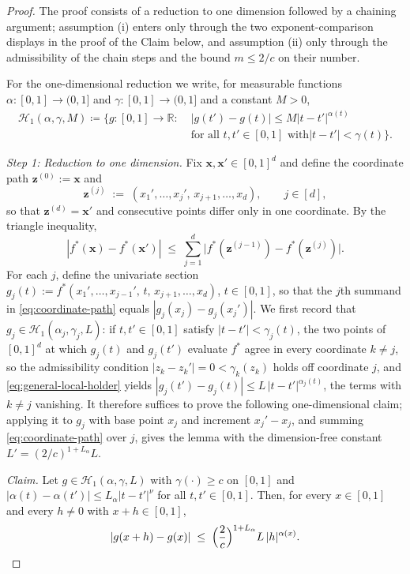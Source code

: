 \documentclass[10pt,a4paper]{amsart}
\newcommand{\bx}{\mathbf{x}}
\newcommand{\bz}{\mathbf{z}}
\begin{document}
\begin{proof}
The proof consists of a reduction to one dimension followed by a
chaining argument; assumption (i) enters only through the two
exponent-comparison displays in the proof of the Claim below, and
assumption (ii) only through the admissibility of the chain steps and
the bound $m\le 2/c$ on their number.

For the one-dimensional reduction we write, for measurable functions
$\alpha:[0,1]\to(0,1]$ and $\gamma:[0,1]\to(0,1]$ and a constant
$M>0$,
\begin{equation}\label{eq:1d-class}
\begin{aligned}
\mathcal{H}_1(\alpha,\gamma,M)
\coloneqq\bigl\{g:[0,1]\to\mathbb{R}:\;&
\lvert g(t')-g(t)\rvert
\le M\lvert t-t'\rvert^{\alpha(t)}\\
&\text{for all $t,t'\in[0,1]$ with
$\lvert t-t'\rvert<\gamma(t)$}\bigr\}.
\end{aligned}
\end{equation}

\medskip
\noindent\textit{Step 1: Reduction to one dimension.} Fix
$\bx,\bx'\in[0,1]^d$ and define the coordinate path
$\bz^{(0)}:=\bx$ and
\[
  \bz^{(j)} \;:=\; (x_1',\ldots,x_j',\,x_{j+1},\ldots,x_d),
  \qquad j\in[d],
\]
so that $\bz^{(d)}=\bx'$ and consecutive points differ only in one
coordinate. By the triangle inequality,
\begin{equation}\label{eq:coordinate-path}
  |f^*(\bx)-f^*(\bx')|
  \;\le\; \sum_{j=1}^d
  \bigl|f^*(\bz^{(j-1)})-f^*(\bz^{(j)})\bigr| .
\end{equation}
For each $j$, define the univariate section
$g_j(t):=f^*(x_1',\ldots,x_{j-1}',\,t,\,x_{j+1},\ldots,x_d)$,
$t\in[0,1]$, so that the $j$th summand in \eqref{eq:coordinate-path}
equals $|g_j(x_j)-g_j(x_j')|$. We first record that
$g_j\in\mathcal{H}_{1}(\alpha_j,\gamma_j,L)$: if
$t,t'\in[0,1]$ satisfy $|t-t'|<\gamma_j(t)$, the two points of
$[0,1]^d$ at which $g_j(t)$ and $g_j(t')$ evaluate $f^*$ agree in
every coordinate $k\neq j$, so the admissibility condition
$|z_k-z_k'|=0<\gamma_k(z_k)$ holds off coordinate $j$, and
\eqref{eq:general-local-holder} yields
$|g_j(t')-g_j(t)|\le L\,|t-t'|^{\alpha_j(t)}$, the terms with
$k\neq j$ vanishing. It therefore suffices to prove the following
one-dimensional claim; applying it to $g_j$ with base point $x_j$ and
increment $x_j'-x_j$, and summing \eqref{eq:coordinate-path} over $j$,
gives the lemma with the dimension-free constant
$L'=(2/c)^{1+L_\alpha}L$.

\medskip
\noindent\emph{Claim.} Let
$g\in\mathcal{H}_{1}(\alpha,\gamma,L)$ with
$\gamma(\cdot)\ge c$ on $[0,1]$ and
$\lvert\alpha(t)-\alpha(t')\rvert\le L_\alpha\lvert t-t'\rvert^{\nu}$
for all $t,t'\in[0,1]$. Then, for every $x\in[0,1]$ and every $h\neq0$
with $x+h\in[0,1]$,
\[
  \lvert g(x+h)-g(x)\rvert
  \;\le\; \Bigl(\frac{2}{c}\Bigr)^{1+L_\alpha} L\,
  \lvert h\rvert^{\alpha(x)} .
\]


\end{proof}
\end{document}
